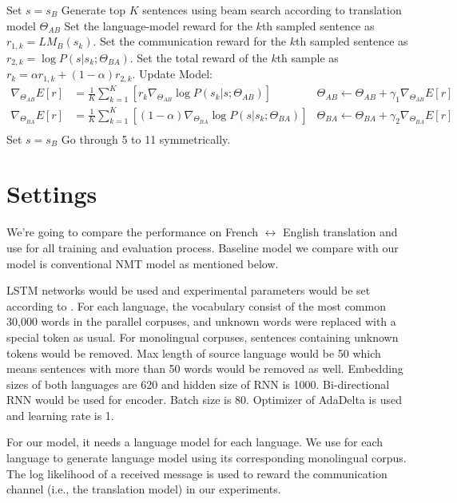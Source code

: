 \documentclass[11pt]{article}
\begin{document}
{\begin{algorithm}
\begin{algorithmic}[1]
\State Set $s = s_B$
\State Generate top $K$ sentences using beam search according to translation model $\Theta_{AB}$
\State Set the language-model reward for the $k$th sampled sentence as $r_{1,k}=LM_B(s_{k})$.
\State Set the communication reward for the $k$th sampled sentence as $r_{2,k}=\log P(s|s_{k};\Theta_{BA})$.
\State Set the total reward of the $k$th sample as $r_k = \alpha r_{1,k} + (1-\alpha)r_{2,k}$.
\EndFor
\State Update Model:
\begin{align*}
\nabla_{\Theta_{AB}} E[r] &= \frac{1}{K}\sum^K_{k=1}[r_k\nabla_{\Theta_{AB}}\log P(s_{k}|s; \Theta_{AB})]&\Theta_{AB} \leftarrow\Theta_{AB} + \gamma_1\nabla_{\Theta_{AB}} E[r]\\
\nabla_{\Theta_{BA}} E[r] &= \frac{1}{K}\sum^K_{k=1} [(1-\alpha)\nabla_{\Theta_{BA}} \log P(s|s_{k};\Theta_{BA})]&\Theta_{BA} \leftarrow\Theta_{BA} + \gamma_2\nabla_{\Theta_{BA}} E[r]\\
\end{align*}
\State Set $s = s_B$
\State Go through 5 to 11 symmetrically.
\end{algorithmic}
\end{algorithm}
\part{Settings}
We're going to compare the performance on French $\leftrightarrow$ English translation and use \href{https://github.com/OpenNMT/OpenNMT-py}{\color{blue}{OpenNMT in PyTorch }} for all training and evaluation process. Baseline model we compare with our model is conventional NMT model as mentioned below.

LSTM networks would be used and experimental parameters would be set according to \cite{bahdanau2014neural}. For each language, the vocabulary consist of the most common 30,000 words in the parallel corpuses, and unknown words were replaced with a special token as usual. For monolingual corpuses, sentences containing unknown tokens would be removed. Max length of source language would be 50 which means sentences with more than 50 words would be removed as well. Embedding sizes of both languages are 620 and hidden size of RNN is 1000. Bi-directional RNN would be used for encoder. Batch size is 80. Optimizer of AdaDelta is used and learning rate is 1.

For our model, it needs a language model for each language. We use \href{https://github.com/mspandit/rnnlm}{\color{blue}{RNNLM Toolkit}}\cite{mikolov2010recurrent} for each language to generate language model using its corresponding monolingual corpus. The log likelihood of a received message is used to reward the communication channel (i.e., the translation model) in our experiments.

}
\end{document}
